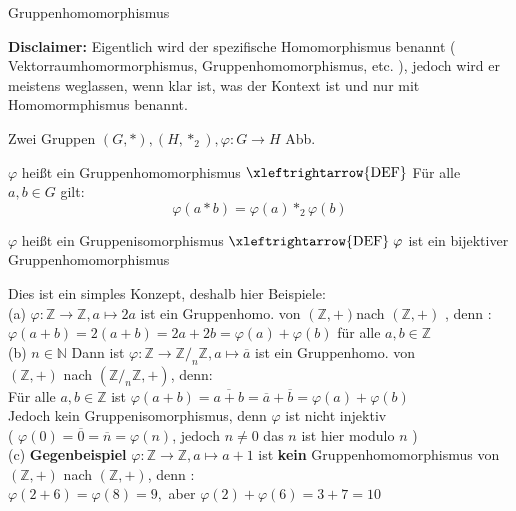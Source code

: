 \documentclass[headsepline,12pt,a4paper]{scrartcl}
\begin{document}
\begin{center}
\item[Gruppenhomomorphismus]
\end{center}
\item \textbf{Disclaimer:} Eigentlich wird der spezifische Homomorphismus benannt ( Vektorraumhomormorphismus, Gruppenhomomorphismus, etc. ), jedoch wird er meistens weglassen, wenn klar ist, was der Kontext ist und nur mit Homomormphismus benannt. \\
\item Zwei Gruppen $(G,*), (H,*_2) , \varphi: G\rightarrow H $ Abb.
\item  $\varphi$  heißt ein Gruppenhomomorphismus $ \xleftrightarrow{\text{DEF}} $ Für alle $a,b \in G $ gilt: 
$$ \varphi(a*b) = \varphi(a) *_2 \varphi(b) $$
\item  $\varphi$  heißt ein Gruppenisomorphismus $ \xleftrightarrow{\text{DEF}} \; \varphi $ ist ein bijektiver Gruppenhomomorphismus 
\item Dies ist ein simples Konzept, deshalb hier Beispiele:  \\
(a) $ \varphi : \mathbb{Z} \rightarrow \mathbb{Z} , a \mapsto 2a $ ist ein Gruppenhomo. von $(\mathbb{Z}, + ) $nach $(\mathbb{Z}, + ) $ , denn : \\
$\varphi(a+b) = 2 (a+b) = 2a + 2b = \varphi (a) + \varphi (b) $ für alle $ a,b \in \mathbb{Z} $ \\

(b) $ n \in \mathbb{N} $ Dann ist $ \varphi : \mathbb{Z} \rightarrow \mathbb{Z} /_n \mathbb{Z} , a \mapsto \overline{a} $ ist ein Gruppenhomo. von \\
$( \mathbb{Z}, + ) $ nach  $(\mathbb{Z} /_n \mathbb{Z},+)$, denn: \\
Für alle $a,b \in \mathbb{Z} $ ist $ \varphi(a+b) = \overline{a+b} = \overline{a} + \overline{b} = \varphi(a) + \varphi (b) $ \\
Jedoch kein Gruppenisomorphismus, denn $ \varphi $ ist nicht injektiv \\
( $ \varphi(0) = \overline{0} = \overline{n} = \varphi(n) $, jedoch $ n \neq 0 $ das $n$ ist hier modulo $n$ ) \\
 
(c) \textbf{Gegenbeispiel} $ \varphi: \mathbb{Z} \rightarrow \mathbb{Z} , a \mapsto a+1 $ ist \textbf{kein} Gruppenhomomorphismus von \\
$(\mathbb{Z},+)$ nach $( \mathbb{Z}, + )$, denn : \\
$ \varphi(2+6) = \varphi(8) = 9 , $ aber $ \varphi(2)+ \varphi(6) = 3+7=10 $
\end{document}
